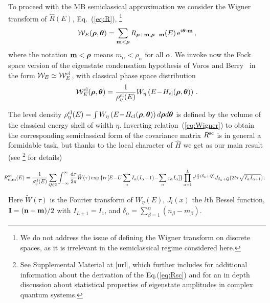 \documentclass[prl,a4paper,twocolumn,superscriptaddress,floatfix]{revtex4-1}%
\newcommand{\ud}{\mathrm{d}}
\newcommand{\ic}{\mathrm{i}}
\newcommand{\zZ}{\mathbb{Z}}
\begin{document}
To proceed with the MB semiclassical approximation we consider the Wigner transform  of $\hat{R}(E)$, Eq.~(\ref{eq:R}), \footnote{We do not address the issue of defining the Wigner transform on discrete spaces, as it is irrelevant in the semiclassical regime considered here.}
\begin{equation}
\label{eq:Wigner}
    {\cal W}_{E}({\boldsymbol \rho},{\boldsymbol \theta})=\sum_{{\bf m} < {\boldsymbol \rho}} R_{{\boldsymbol \rho}+{\bf m},{\boldsymbol \rho}-{\bf m}}(E) \, {\rm e}^{i{\boldsymbol \theta}\cdot {\bf m}} \,  ,
\end{equation}
where the notation ${\bf m} < {\boldsymbol \rho}$ means $m_{\alpha}<\rho_{\alpha}$ for all $\alpha$. We invoke now the Fock space version of the eigenstate condensation hypothesis of Voros and Berry~\cite{voros1976semi,berry1977semi} in the form ${\cal W}_{E}\simeq {\cal W}_{E}^{{\rm cl}}$, with classical phase space distribution
\begin{equation}
\label{eq:RW}
{\cal W}_{E}^{{\rm cl}}({\boldsymbol \rho},{\boldsymbol \theta})=\frac{1}{\rho_{\eta}^{{\rm cl}}(E)}W_{\eta}\left(E\!-\!H_{\rm cl}({\boldsymbol \rho},{\boldsymbol \theta})\right) \, .
\end{equation}

The level density $
\rho_{\eta}^{{\rm cl}}(E)=\int W_{\eta}\left(E\!-\!H_{\rm cl}({\boldsymbol \rho},{\boldsymbol \theta})\right) d{\boldsymbol \rho}d{\boldsymbol \theta}$ is
 defined by the volume of the classical energy shell of width $\eta$. Inverting relation~(\ref{eq:Wigner}) to obtain the corresponding semiclassical form of the covariance matrix $R^{\rm sc}$ is in general a formidable task, but thanks to the local character of $\hat{H}$ we get as our main result (see \footnote{See Supplemental Material at [url], which further includes \cite{Fischer_2013} for additional information about the derivation of the Eq.(\ref{eq:Rsc}) and \cite{beugeling2018statistical} for an in depth discussion about statistical properties of eigenstate amplitudes in complex quantum systems.} for details)
\begin{widetext}
\begin{equation}
\label{eq:Rsc}
\hspace{-0.3cm}R^{{\rm sc}}_{{\bf n},{\bf m}}(E)=\frac{1}{\rho_{\eta}^{{\rm cl}}(E)}\sum_{Q\in\zZ}  \int_{-\infty}^\infty\frac{\ud \tau}{2\pi} \tilde{W}(\tau)\exp{\{\ic \tau [E\!-\! U \sum_{\alpha} I_\alpha(I_\alpha\!-\!1) \!-\! \sum_{\alpha} \varepsilon_\alpha I_\alpha]}\} \prod_{\alpha=1}^L
  e^{\ic \frac{\pi}{2}(\delta_{\alpha}+ Q)} J_{\delta_{\alpha}+ Q}(2t\tau\sqrt{I_\alpha I_{\alpha+1}}) \, .
\end{equation}
\end{widetext}
Here $\tilde{W}(\tau)$ is the Fourier transform of $W_{\eta}(E)$,
$J_{l}(x)$ the $l$th Bessel function, ${\bf I}= ({\bf n}+{\bf m})/2$ with $I_{L+1}=I_{1}$, and $\delta_\alpha = \sum_{\beta=1}^\alpha (n_\beta - m_\beta)$.
    
\end{document}
